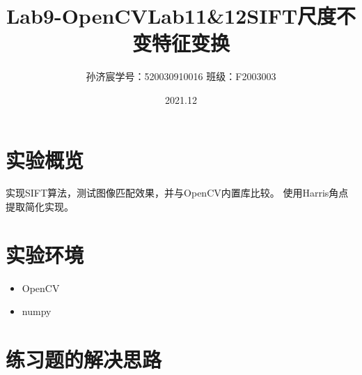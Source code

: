 \documentclass[12pt,a4paper]{article}
\title{Lab9-OpenCV}
\title{Lab11\&{12}\quad SIFT尺度不变特征变换}
\date{2021.12}
\author{孙济宸\quad \quad 学号：520030910016 \quad  \quad 班级：F2003003}
\begin{document}
\maketitle
\section{实验概览}
实现SIFT算法，测试图像匹配效果，并与OpenCV内置库比较。
使用Harris角点提取简化实现。
\section{实验环境}
\begin{itemize}
	\item OpenCV
	\item numpy
	
\end{itemize}


\section{练习题的解决思路}
\end{document}
